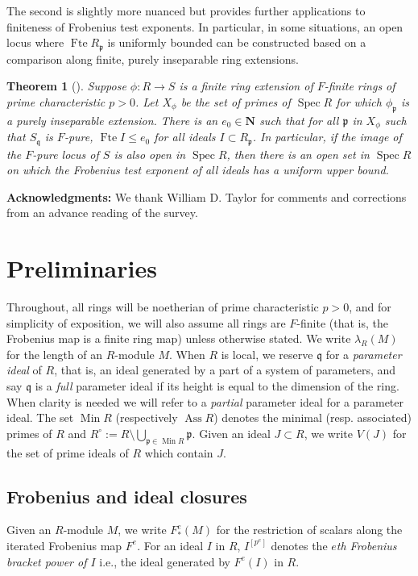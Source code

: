 \documentclass{amsproc}
\newtheorem{theorem}{Theorem}[section]
\theoremstyle{definition}
\theoremstyle{remark}
\numberwithin{equation}{section}
\newcommand{\NN}{\mathbf{N}}
\newcommand{\fp}{\mathfrak{p}}
\newcommand{\fq}{\mathfrak{q}}
\newcommand{\Spec}{\operatorname{Spec}}
\newcommand{\Min}{\operatorname{Min}}
\newcommand{\fbp}[1]{\left[ #1 \right]}
\newcommand{\fte}{\operatorname{Fte}}
\begin{document}
The second is slightly more nuanced but provides further applications to finiteness of Frobenius test exponents. In particular, in some situations, an open locus where $\fte R_\fp$ is uniformly bounded can be constructed based on a comparison along finite, purely inseparable ring extensions.


\begin{theorem}[]
Suppose $\phi \colon R\rightarrow S$ is a finite ring extension of $F$-finite rings of prime characteristic $p>0$. Let $X_\phi$ be the set of primes of $\Spec R$ for which $\phi_\fp$ is a purely inseparable extension. There is an $e_0 \in \NN$ such that for all $\fp$ in $X_\phi$ such that $S_\fq$ is $F$-pure, $\fte I \le e_0$ for all ideals $I\subset R_\fp$. In particular, if the image of the $F$-pure locus of $S$ is also open in $\Spec R$, then there is an open set in $\Spec R$ on which the Frobenius test exponent of all ideals has a uniform upper bound.\end{theorem}

{\bf Acknowledgments:} We thank William D. Taylor for comments and corrections from an advance reading of the survey. 


\section{Preliminaries}


Throughout, all rings will be noetherian of prime characteristic $p>0$, and for simplicity of exposition, we will also assume all rings are $F$-finite (that is, the Frobenius map is a finite ring map) unless otherwise stated. We write $\lambda_R(M)$ for the length of an $R$-module $M$. When $R$ is local, we reserve $\fq$ for a \textit{parameter ideal} of $R$, that is, an ideal generated by a part of a system of parameters, and say $\fq$ is a \textit{full} parameter ideal if its height is equal to the dimension of the ring. When clarity is needed we will refer to a \textit{partial} parameter ideal for a parameter ideal. The set $\Min R$ (respectively $\operatorname{Ass} R$) denotes the minimal (resp. associated) primes of $R$ and $R^\circ := R\setminus \bigcup_{\fp \in \Min R} \fp.$ Given an ideal $J\subset R$, we write $V(J)$ for the set of prime ideals of $R$ which contain $J$.

\subsection{ Frobenius and ideal closures} Given an $R$-module $M$, we write $F^e_*(M)$ for the restriction of scalars along the iterated Frobenius map $F^e$. For an ideal $I$ in $R$, $I^{\fbp{p^e}}$ denotes the \textit{$e$th Frobenius bracket power of $I$} i.e., the ideal generated by $F^e(I)$ in $R$. 
\end{document}
